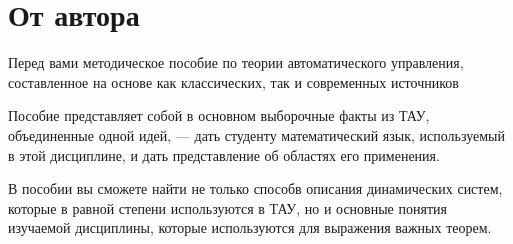 \documentclass[../../TAU.tex]{subfiles}
\begin{document}
    \chapter*{От автора}

        Перед вами методическое пособие по теории автоматического управления, составленное на основе как классических, так и современных источников

        Пособие представляет собой в основном выборочные факты из ТАУ, объединенные одной идей, — дать студенту математический язык, используемый в этой дисциплине, и дать представление об областях его применения.

        В пособии вы сможете найти не только способв описания динамических систем, которые в равной степени используются в ТАУ, но и основные понятия изучаемой дисциплины, которые используются для выражения важных теорем.
\end{document}
